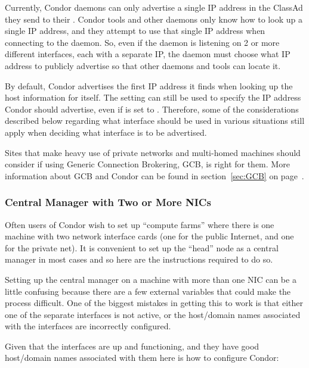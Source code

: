 \begin{description}
  Currently, Condor daemons can only advertise a single IP address in
  the ClassAd they send to their .
  Condor tools and other daemons only know how to look up a single IP
  address, and they attempt to use that single IP address
  when connecting to the daemon.
  So, even if the daemon is listening on 2 or more different interfaces,
  each with a separate IP, the daemon must choose what IP address to
  publicly advertise so that other daemons and tools can locate it.

  By default, Condor advertises the first IP address it finds
  when looking up the host information for itself.  
  The  setting can still be used to
  specify the IP address Condor should advertise, even if
   is set to .
  Therefore, some of the considerations described below regarding what
  interface should be used in various situations still apply when
  deciding what interface is to be advertised.

\end{description}

Sites that make heavy use of private networks and multi-homed machines
should consider if using Generic Connection Brokering, GCB, is
right for them.
More information about GCB and Condor can be found in
section~\ref{sec:GCB} on page~\pageref{sec:GCB}.


\subsubsection{Central Manager with Two or More NICs}

Often users of Condor wish to set up ``compute farms'' where there is one
machine with two network interface cards (one for the public Internet,
and one for the private net). It is convenient to set up the ``head''
node as a central manager in most cases and so here are the instructions
required to do so.

Setting up the central manager on a machine with more than one NIC can
be a little confusing because there are a few external variables
that could make the process difficult. One of the biggest mistakes
in getting this to work is that either one of the separate interfaces is
not active, or the host/domain names associated with the interfaces are
incorrectly configured. 

Given that the interfaces are up and functioning, and they have good
host/domain names associated with them here is how to configure Condor:

